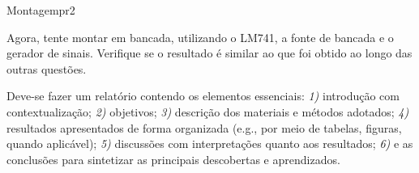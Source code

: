 \begin{problem}{Montagem}{pr2}

Agora, tente montar em bancada, utilizando o LM741, a fonte de bancada e o gerador de sinais. Verifique se o resultado é similar ao que foi obtido ao longo das outras questões. \\

\end{problem}

\begin{obs}

Deve-se fazer um relatório contendo os elementos essenciais: \textit{1)} introdução com contextualização; \textit{2)} objetivos; \textit{3)} descrição dos materiais e métodos adotados; \textit{4)} resultados apresentados de forma organizada (e.g., por meio de tabelas, figuras, quando aplicável); \textit{5)} discussões com interpretações quanto aos resultados; \textit{6)} e as conclusões para sintetizar as principais descobertas e aprendizados.

\end{obs}

\newpage

\printbibliography


